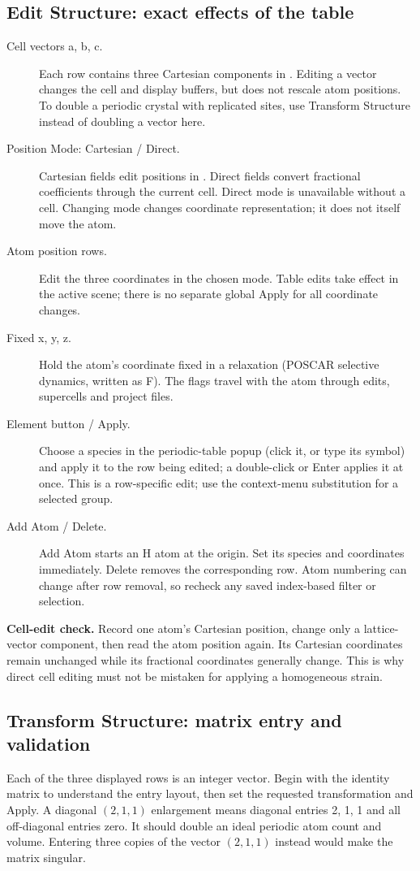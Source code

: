 \subsection{Edit Structure: exact effects of the table}
\begin{description}
\item[Cell vectors a, b, c.] Each row contains three Cartesian components in \angstrom. Editing a vector changes the cell and display buffers, but does not rescale atom positions. To double a periodic crystal with replicated sites, use Transform Structure instead of doubling a vector here.
\item[Position Mode: Cartesian / Direct.] Cartesian fields edit positions in \angstrom. Direct fields convert fractional coefficients through the current cell. Direct mode is unavailable without a cell. Changing mode changes coordinate representation; it does not itself move the atom.
\item[Atom position rows.] Edit the three coordinates in the chosen mode. Table edits take effect in the active scene; there is no separate global Apply for all coordinate changes.
\item[Fixed x, y, z.] Hold the atom's coordinate fixed in a relaxation (POSCAR selective dynamics, written as F). The flags travel with the atom through edits, supercells and project files.
\item[Element button / Apply.] Choose a species in the periodic-table popup (click it, or type its symbol) and apply it to the row being edited; a double-click or Enter applies it at once. This is a row-specific edit; use the context-menu substitution for a selected group.
\item[Add Atom / Delete.] Add Atom starts an H atom at the origin. Set its species and coordinates immediately. Delete removes the corresponding row. Atom numbering can change after row removal, so recheck any saved index-based filter or selection.
\end{description}
\textbf{Cell-edit check.} Record one atom's Cartesian position, change only a lattice-vector component, then read the atom position again. Its Cartesian coordinates remain unchanged while its fractional coordinates generally change. This is why direct cell editing must not be mistaken for applying a homogeneous strain.

\subsection{Transform Structure: matrix entry and validation}
Each of the three displayed rows is an integer vector. Begin with the identity matrix to understand the entry layout, then set the requested transformation and Apply. A diagonal $(2,1,1)$ enlargement means diagonal entries 2, 1, 1 and all off-diagonal entries zero. It should double an ideal periodic atom count and volume. Entering three copies of the vector $(2,1,1)$ instead would make the matrix singular.

